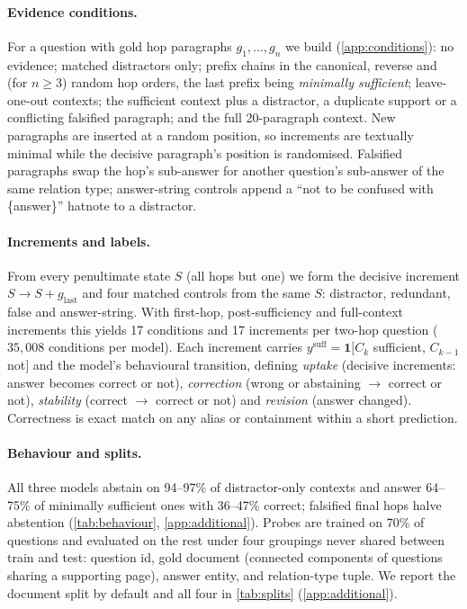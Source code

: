 \paragraph{Evidence conditions.}
For a question with gold hop paragraphs $g_1,\dots,g_n$ we build (\cref{app:conditions}): no evidence; matched distractors only; prefix chains in the canonical, reverse and (for $n\ge3$) random hop orders, the last prefix being \emph{minimally sufficient}; leave-one-out contexts; the sufficient context plus a distractor, a duplicate support or a conflicting falsified paragraph; and the full 20-paragraph context. New paragraphs are inserted at a random position, so increments are textually minimal while the decisive paragraph's position is randomised. Falsified paragraphs swap the hop's sub-answer for another question's sub-answer of the same relation type; answer-string controls append a ``not to be confused with \{answer\}'' hatnote to a distractor.

\paragraph{Increments and labels.}
From every penultimate state $S$ (all hops but one) we form the decisive increment $S\to S{+}g_{\text{last}}$ and four matched controls from the same $S$: distractor, redundant, false and answer-string. With first-hop, post-sufficiency and full-context increments this yields 17 conditions and 17 increments per two-hop question ($35{,}008$ conditions per model). Each increment carries $y^{\mathrm{suff}}=\mathbf 1[C_k$ sufficient, $C_{k-1}$ not$]$ and the model's behavioural transition, defining \emph{uptake} (decisive increments: answer becomes correct or not), \emph{correction} (wrong or abstaining $\to$ correct or not), \emph{stability} (correct $\to$ correct or not) and \emph{revision} (answer changed). Correctness is exact match on any alias or containment within a short prediction.

\paragraph{Behaviour and splits.}
All three models abstain on 94--97\% of distractor-only contexts and answer 64--75\% of minimally sufficient ones with 36--47\% correct; falsified final hops halve abstention (\cref{tab:behaviour}, \cref{app:additional}).
Probes are trained on 70\% of questions and evaluated on the rest under four groupings never shared between train and test: question id, gold document (connected components of questions sharing a supporting page), answer entity, and relation-type tuple. We report the document split by default and all four in \cref{tab:splits} (\cref{app:additional}).
